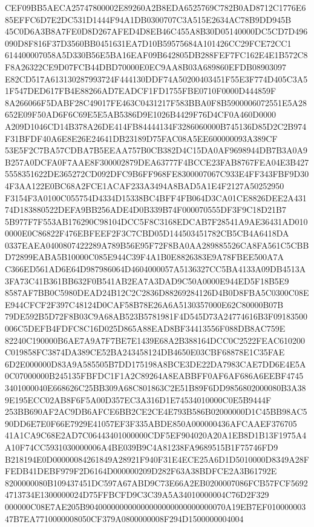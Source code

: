 \documentclass[UTF8,fontset=fandol,zihao=-4,a4paper]{ctexart}
\begin{document}
{{CEF09BB5AECA25747800002E89260A2B8EDA6525769C782B0AD8712C1776E685EFFC6D7E2DC531D1444F94A1DB0300707C3A515E2634AC78B9DD945B
45C0D6A3B8A7FE0D8D267AFED4D8EB46C455A8B30D05140000DC5CD7D496090D8F816F37D3560BB0451631EA7D10B59575684A101426CC29FCE72CC1
614400007058A5D330B56E5BA16EAF09B642805DB288FEF7FC162E4E1B572C8F8A26322CE9D07FCB44DBD70000E0EC9AA8B03A689860EFDB08903097
E82CD517A613130287993724F444130DDF74A50200403451F55E3F774D405C3A51F547DED617FB4E88266AD7EADCF1FD1755FBE0710F0000D444859F
8A266066F5DABF28C49017FE463C0431217F583BBA0F8B5900006072551E5A28652E09F50AD6F6C69E5E5AB5386D9E1026B4429F76D4CF0A460D0000
A209D1046CD14B378A26DE414FB84444134F3286060000B745136D85D2C2B974F31BFDF40A6E8E26E24641DB23189D75FAC08A5EE600000093A389CF
53E5F2C7BA57CDBA7B5EEAA757B0CB382D4C15DA0AF9698944DB7B3A0A9B257A0DCFA0F7AAE8F300002879DEA63777F4BCCE23FAB8767FEA04E3B427
5558351622DE365272CD092DFC9B6FF968FE8300007067C933E4FF343FBF9D304F3AA122E0BC68A2FCE1ACAF233A3494A8BAD5A1E4F2127A50252950
F3154F3A0100C055754D4334D15338BC4BFF4FB064D3CA01CE8826DEE2A43174D183880522DEFA9BB256ADE4D0B339B74F000070555DF3F9C18D21B7
5B977F7F553AB176290C98104DCC5F8C3168EDCAB7F28541A9AE36431AD0100000E0C86822F476EBFEEF2F3C7CBD05D144503451782CB5CB4A6418DA
0337EAEA0400807422289A789B56E95F72F8BA0AA289885526CA8FA561C5CBBD72899EABA5B10000C085E944C39F4A1B0E8826383E9A78FBEE500A7A
C366ED561AD6E64D987986064D4604000057A5136327CC5BA4133A09DB4513A3FA73C41B361BB632F0B541AB2EA7A3DAD9C50A0000E944ED5F18B5E9
8587AF7BB0C5980DEAD24B12C2C2836D88269284126D4B0D8FBA5C0300C08EE944CFCF2F397C48124D0CAF58B78E26A6A5130357000E62C80000B07B
79DE592B5D72F8B03C9A68AB523B5781981F4D545D73A24774616B3F09183500006C5DEFB4FDFC8C16D025D865A88EAD8BF34413556F088DB8AC759E
82240C190000B6AE7A9A7F7BE7E1439E68A2B388164DCC0C2522FEAC610200C019858FC3874DA389CE52BA243458124DB4650E03CBF68878E1C35FAE
6D2E000000D83A9A585505B7DD175198A8BCE3DE22DA7983CAE7DD6E4E5A0C07000000B245135FBFDC1F1A2C89264A8EABBFF0AF6AF686A6EEBF4745
3401000040E668626C25BB309A68C801863C2E51B89F6DD9856802000080B3A389E195ECC02AB8F6F5A00D357EC3A316D1E74534010000C0E5B9444F
253BB690AF2AC9DB6AFCE6BB2CE2CE4E793B586B02000000D1C45BB98AC590DD6E7E0F66E7929E41057EF3F335ABDE850A000000436AFCAAEF376705
41A1CA9C68E2AD7C06443401000000CDF5EF904020A20A1EB8D1B13F1975A4A10F74CC5931030000006A4BE039B9C4A81238FA9689515B1F75746FD9
B218194E0D00000084261849A28921F940F31E4ECE25A6D1D5010000D8349A28FFEDB41DEBF979F2D6164D000000209D282F63A38BDFCE2A3B61792E
8200000080B109437451DC597A67ABD9C73E66A2EB0200007086FCB57FCF56924713734E1300000024D75FFBCFD9C3C39A5A34010000004C76D2F329
000000C08E7AE205B904000000000000000000000000000070A19EB7EF01000000347B7EA7710000008050CF379A0800000008F294D1500000004004
}}
\end{document}
